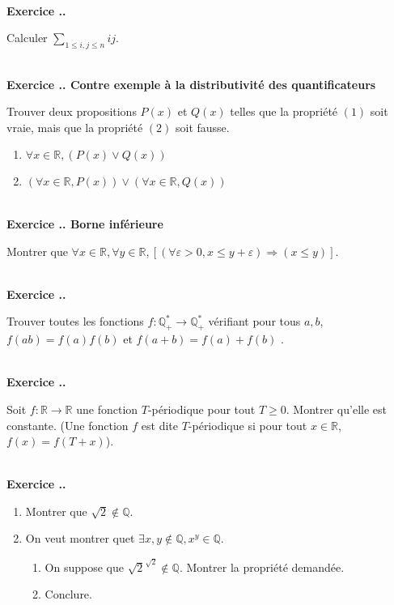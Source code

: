 \documentclass{article}
\newcommand{\mb}[1]{\mathbb{#1}}
\newcounter{exo}
\newcommand{\exercice}[1][\null]{\textbf{\\ \large Exercice \thesection.\theexo. \normalsize #1} \addtocounter{exo}{1}}
\begin{document}
\exercice  Calculer $\displaystyle \sum_{1 \le i, j \le n} ij$.


\exercice[Contre exemple à la distributivité des quantificateurs]

Trouver deux propositions $P(x)$ et $Q(x)$ telles que la propriété 
$(1)$ soit vraie, mais que la propriété $(2)$ soit fausse.

\begin{enumerate}[(1)]
    \item $\forall x \in \mathbb{R}, (P (x) \vee Q(x))$
    \item $\left(\forall x \in \mathbb{R}, P(x)\right) 
        \vee 
        \left(\forall x \in \mathbb{R}, Q(x)\right)$
\end{enumerate}

\exercice[Borne inférieure]

Montrer que $\forall x \in \mb{R}, \forall y \in \mb{R}, \left[ (\forall \varepsilon > 0, x \le y + \varepsilon) \Rightarrow (x \le y) \right]$.

\exercice

Trouver toutes les fonctions $f : \mb{Q}_{+}^* \rightarrow \mb{Q}_{+}^*$ vérifiant pour tous $a,b$, $f(ab) = f(a)f(b)$ et $f(a+b) = f(a)+f(b)$ .



\exercice

Soit $f : \mb{R} \rightarrow \mb{R}$ une fonction $T$-périodique pour tout $T \ge 0$. Montrer qu'elle est constante. (Une fonction $f$ est dite $T$-périodique si pour tout $x \in \mb{R}$, $f(x) = f(T+x)$).

\exercice

\begin{enumerate}

\item Montrer que $\sqrt{2} \not \in \mb{Q}$.

\item On veut montrer quet $\exists x, y \not \in \mb{Q}, x^y \in \mb{Q}$.

\begin{enumerate}

\item On suppose que $\sqrt{2}^{\sqrt{2}} \not \in \mb{Q}$. Montrer la propriété demandée.

\item Conclure.

\end{enumerate}



\end{enumerate}
\end{document}
